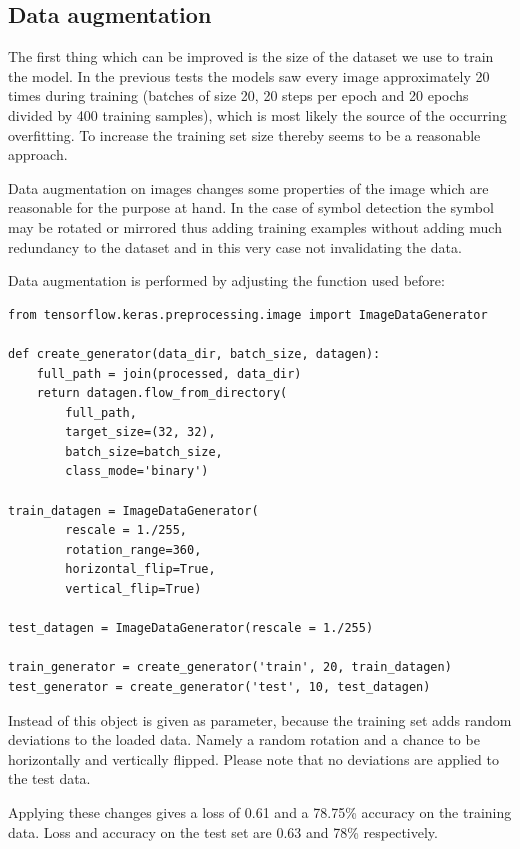 \subsection{Data augmentation}\label{ch:data_augmentation}
The first thing which can be improved is the size of the dataset we use to train the model.
In the previous tests the models saw every image approximately 20 times during training (batches of size 20, 20 steps per epoch and 20 epochs divided by 400 training samples), which is most likely the source of the occurring overfitting.
To increase the training set size thereby seems to be a reasonable approach.

Data augmentation on images changes some properties of the image which are reasonable for the purpose at hand.
In the case of symbol detection the symbol may be rotated or mirrored thus adding training examples without adding much redundancy to the dataset and in this very case not invalidating the data.

Data augmentation is performed by adjusting the  function used before:

\begin{lstlisting}
from tensorflow.keras.preprocessing.image import ImageDataGenerator

def create_generator(data_dir, batch_size, datagen):
    full_path = join(processed, data_dir)
    return datagen.flow_from_directory(
        full_path,
        target_size=(32, 32),
        batch_size=batch_size,
        class_mode='binary')

train_datagen = ImageDataGenerator(
        rescale = 1./255,
        rotation_range=360,
        horizontal_flip=True,
        vertical_flip=True)

test_datagen = ImageDataGenerator(rescale = 1./255)

train_generator = create_generator('train', 20, train_datagen)
test_generator = create_generator('test', 10, test_datagen)
\end{lstlisting}

Instead of  this object is given as parameter, because the training set adds random deviations to the loaded data.
Namely a random rotation and a chance to be horizontally and vertically flipped.
Please note that no deviations are applied to the test data.

Applying these changes gives a loss of 0.61 and a 78.75\% accuracy on the training data.
Loss and accuracy on the test set are 0.63 and 78\% respectively.

